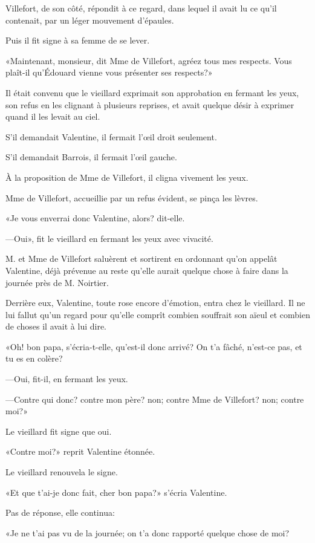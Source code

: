 Villefort, de son côté, répondit à ce regard, dans lequel il avait lu ce qu'il contenait, par un léger mouvement d'épaules. 

Puis il fit signe à sa femme de se lever. 

«Maintenant, monsieur, dit Mme de Villefort, agréez tous mes respects. Vous plaît-il qu'Édouard vienne vous présenter ses respects?» 

Il était convenu que le vieillard exprimait son approbation en fermant les yeux, son refus en les clignant à plusieurs reprises, et avait quelque désir à exprimer quand il les levait au ciel. 

S'il demandait Valentine, il fermait l'œil droit seulement.  

S'il demandait Barrois, il fermait l'œil gauche. 

À la proposition de Mme de Villefort, il cligna vivement les yeux. 

Mme de Villefort, accueillie par un refus évident, se pinça les lèvres. 

«Je vous enverrai donc Valentine, alors? dit-elle. 

—Oui», fit le vieillard en fermant les yeux avec vivacité. 

M. et Mme de Villefort saluèrent et sortirent en ordonnant qu'on appelât Valentine, déjà prévenue au reste qu'elle aurait quelque chose à faire dans la journée près de M. Noirtier. 

Derrière eux, Valentine, toute rose encore d'émotion, entra chez le vieillard. Il ne lui fallut qu'un regard pour qu'elle comprît combien souffrait son aïeul et combien de choses il avait à lui dire. 

«Oh! bon papa, s'écria-t-elle, qu'est-il donc arrivé? On t'a fâché, n'est-ce pas, et tu es en colère? 

—Oui, fit-il, en fermant les yeux. 

—Contre qui donc? contre mon père? non; contre Mme de Villefort? non; contre moi?» 

Le vieillard fit signe que oui. 

«Contre moi?» reprit Valentine étonnée. 

Le vieillard renouvela le signe. 

«Et que t'ai-je donc fait, cher bon papa?» s'écria Valentine. 

Pas de réponse, elle continua: 

«Je ne t'ai pas vu de la journée; on t'a donc rapporté quelque chose de moi? 

